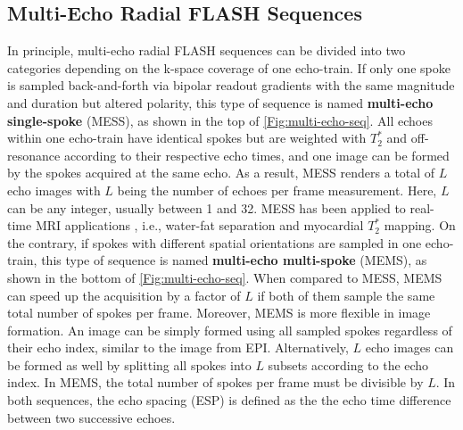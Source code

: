 \subsection{Multi-Echo Radial FLASH Sequences} \label{Sec:me-theory-seq}
In principle, multi-echo radial FLASH sequences can be divided into two categories depending on the k-space coverage of one echo-train. If only one spoke is sampled back-and-forth via bipolar readout gradients with the same magnitude and duration but altered polarity, this type of sequence is named \textbf{multi-echo single-spoke} (\acs{MESS}), as shown in the top of \cref{Fig:multi-echo-seq}. All echoes within one echo-train have identical spokes but are weighted with $T_2^*$ and off-resonance according to their respective echo times, and one image can be formed by the spokes acquired at the same echo. As a result, MESS renders a total of $L$ echo images with $L$ being the number of echoes per frame measurement. Here, $L$ can be any integer, usually between \num{1} and \num{32}. MESS has been applied to real-time MRI applications \cite{2012_rtmri_app}, i.e., water-fat separation and myocardial $T_2^*$ mapping. On the contrary, if spokes with different spatial orientations are sampled in one echo-train, this type of sequence is named \textbf{multi-echo multi-spoke} (\acs{MEMS}), as shown in the bottom of \cref{Fig:multi-echo-seq}. When compared to MESS, MEMS can speed up the acquisition by a factor of $L$ if both of them sample the same total number of spokes per frame. Moreover, MEMS is more flexible in image formation. An image can be simply formed using all sampled spokes regardless of their echo index, similar to the image from EPI. Alternatively, $L$ echo images can be formed as well by splitting all spokes into $L$ subsets according to the echo index. In MEMS, the total number of spokes per frame must be divisible by $L$. In both sequences, the echo spacing (\acs{ESP}) is defined as the the echo time difference between two successive echoes. 


